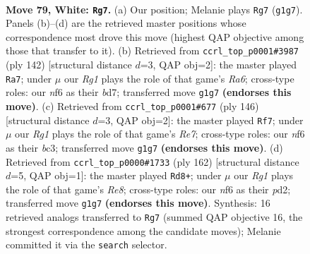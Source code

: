 \documentclass[11pt]{article}
\begin{document}
\clearpage

\begin{figure}[p]\centering
\begin{subfigure}{0.46\textwidth}\centering
\resizebox{\linewidth}{!}{%
\newchessgame
\chessboard[
  setfen={8/8/3k1n2/P7/8/7r/4K3/6R1 w - - 5 79},
  showmover=false,
  pgfstyle=straightmove, color=movearrow, markmove={g1-g7}
]}
\caption{}
\end{subfigure}\hfill
\begin{subfigure}{0.46\textwidth}\centering
\resizebox{\linewidth}{!}{%
\newchessgame
\chessboard[
  setfen={8/3b4/R7/4k2P/8/8/5K2/2r5 w - - 2 72},
  showmover=false,
  pgfstyle=straightmove, color=movearrow, markmove={a6-a7}
]}
\caption{}
\end{subfigure}
\\[4pt]
\begin{subfigure}{0.46\textwidth}\centering
\resizebox{\linewidth}{!}{%
\newchessgame
\chessboard[
  setfen={8/4R3/6P1/2k5/7r/2b2K2/8/8 w - - 14 74},
  showmover=false,
  pgfstyle=straightmove, color=movearrow, markmove={e7-f7}
]}
\caption{}
\end{subfigure}\hfill
\begin{subfigure}{0.46\textwidth}\centering
\resizebox{\linewidth}{!}{%
\newchessgame
\chessboard[
  setfen={4R3/2r5/8/8/1P1k4/8/1K1p4/8 w - - 0 82},
  showmover=false,
  pgfstyle=straightmove, color=movearrow, markmove={e8-d8}
]}
\caption{}
\end{subfigure}
\caption{\textbf{Move 79, White: \texttt{Rg7}.} (a) Our position; Melanie plays \texttt{Rg7} (\texttt{g1g7}). Panels (b)--(d) are the retrieved master positions whose correspondence most drove this move (highest QAP objective among those that transfer to it). (b) Retrieved from \texttt{ccrl\_top\_p0001\#3987} (ply 142) [structural distance $d$=3, QAP obj=2]: the master played \texttt{Ra7}; under $\mu$ our \emph{Rg1} plays the role of that game's \emph{Ra6}; cross-type roles: our \emph{n}f6 as their \emph{b}d7; transferred move \texttt{g1g7} \textbf{(endorses this move)}. (c) Retrieved from \texttt{ccrl\_top\_p0001\#677} (ply 146) [structural distance $d$=3, QAP obj=2]: the master played \texttt{Rf7}; under $\mu$ our \emph{Rg1} plays the role of that game's \emph{Re7}; cross-type roles: our \emph{n}f6 as their \emph{b}c3; transferred move \texttt{g1g7} \textbf{(endorses this move)}. (d) Retrieved from \texttt{ccrl\_top\_p0000\#1733} (ply 162) [structural distance $d$=5, QAP obj=1]: the master played \texttt{Rd8+}; under $\mu$ our \emph{Rg1} plays the role of that game's \emph{Re8}; cross-type roles: our \emph{n}f6 as their \emph{p}d2; transferred move \texttt{g1g7} \textbf{(endorses this move)}. Synthesis: 16 retrieved analogs transferred to \texttt{Rg7} (summed QAP objective 16, the strongest correspondence among the candidate moves); Melanie committed it via the \texttt{search} selector.}
\label{fig:thought-m156}
\end{figure}
\end{document}
